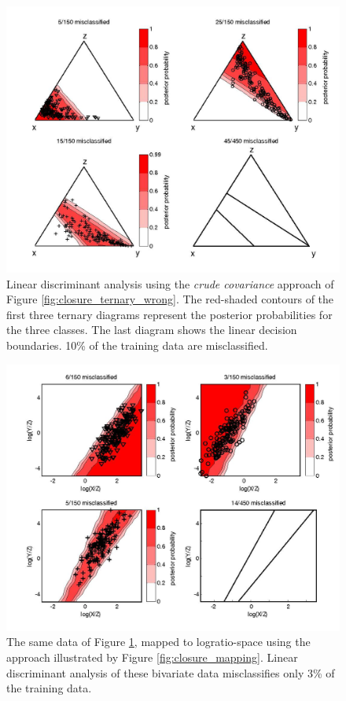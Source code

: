 \begin{figure}[htbp]
  \centering
  \includegraphics[width=600]{figures/closure_discriminant_wrong.jpg}
  \caption[Linear discriminant analysis done the wrong way]{
Linear discriminant analysis using the {\it crude covariance} approach
of Figure \ref{fig:closure_ternary_wrong}.  The red-shaded contours of
the first three ternary diagrams represent the posterior probabilities
for the  three classes.   The last diagram  shows the  linear decision
boundaries. 10\% of the training data are misclassified.}
  \label{fig:closure_discriminant_wrong}
\end{figure}

\begin{figure}[htbp]
  \centering
  \includegraphics[width=600]{figures/closure_binary_discriminant_right.jpg}
\caption[Linear discriminant analysis done the right way]{
The same  data of Figure  \ref{fig:closure_discriminant_wrong}, mapped
to   logratio-space   using  the   approach   illustrated  by   Figure
\ref{fig:closure_mapping}.  Linear   discriminant  analysis  of  these
bivariate data misclassifies only 3\% of the training data.}
  \label{fig:closure_binary_discriminant_right}
\end{figure}

